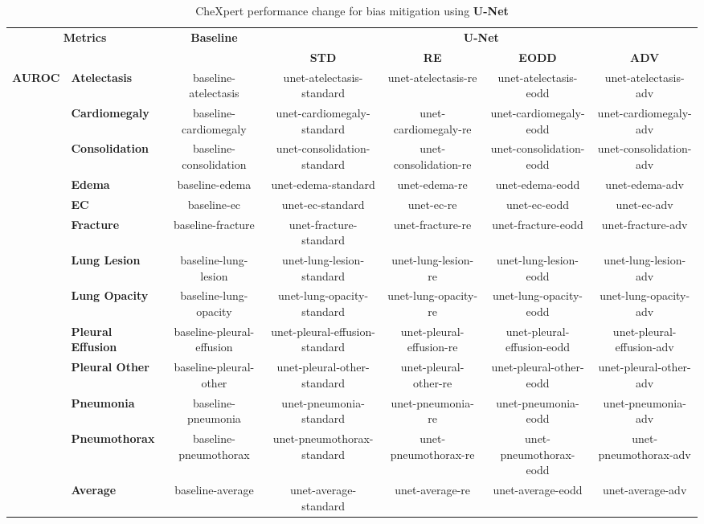 \begin{table}[]
    \centering
    \caption{CheXpert performance change for bias mitigation using \textbf{U-Net}}
    \label{tab:chex_perf_unet}
    \begin{tabular}{ll|c|cccc}
    \hline
    \multicolumn{2}{c|}{\multirow{2}{*}{\textbf{Metrics}}} 
    & \multirow{2}{*}{\textbf{Baseline}} 
    & \multicolumn{4}{c}{\textbf{U-Net}} \\
    \cline{4-7}
     &  &  & \textbf{STD} & \textbf{RE} & \textbf{EODD} & \textbf{ADV} \\
    \hline

    \multirow{13}{*}{\textbf{AUROC}} 
    & \textbf{Atelectasis} & baseline-atelectasis & unet-atelectasis-standard & unet-atelectasis-re & unet-atelectasis-eodd & unet-atelectasis-adv \\
    & \textbf{Cardiomegaly} & baseline-cardiomegaly & unet-cardiomegaly-standard & unet-cardiomegaly-re & unet-cardiomegaly-eodd & unet-cardiomegaly-adv \\
    & \textbf{Consolidation} & baseline-consolidation & unet-consolidation-standard & unet-consolidation-re & unet-consolidation-eodd & unet-consolidation-adv \\
    & \textbf{Edema} & baseline-edema & unet-edema-standard & unet-edema-re & unet-edema-eodd & unet-edema-adv \\
    & \textbf{EC} & baseline-ec & unet-ec-standard & unet-ec-re & unet-ec-eodd & unet-ec-adv \\
    & \textbf{Fracture} & baseline-fracture & unet-fracture-standard & unet-fracture-re & unet-fracture-eodd & unet-fracture-adv \\
    & \textbf{Lung Lesion} & baseline-lung-lesion & unet-lung-lesion-standard & unet-lung-lesion-re & unet-lung-lesion-eodd & unet-lung-lesion-adv \\
    & \textbf{Lung Opacity} & baseline-lung-opacity & unet-lung-opacity-standard & unet-lung-opacity-re & unet-lung-opacity-eodd & unet-lung-opacity-adv \\
    & \textbf{Pleural Effusion} & baseline-pleural-effusion & unet-pleural-effusion-standard & unet-pleural-effusion-re & unet-pleural-effusion-eodd & unet-pleural-effusion-adv \\
    & \textbf{Pleural Other} & baseline-pleural-other & unet-pleural-other-standard & unet-pleural-other-re & unet-pleural-other-eodd & unet-pleural-other-adv \\
    & \textbf{Pneumonia} & baseline-pneumonia & unet-pneumonia-standard & unet-pneumonia-re & unet-pneumonia-eodd & unet-pneumonia-adv \\
    & \textbf{Pneumothorax} & baseline-pneumothorax & unet-pneumothorax-standard & unet-pneumothorax-re & unet-pneumothorax-eodd & unet-pneumothorax-adv \\
    & \textbf{Average} & baseline-average & unet-average-standard & unet-average-re & unet-average-eodd & unet-average-adv \\
    \cline{1-2}
    

\end{tabular}
\end{table}
